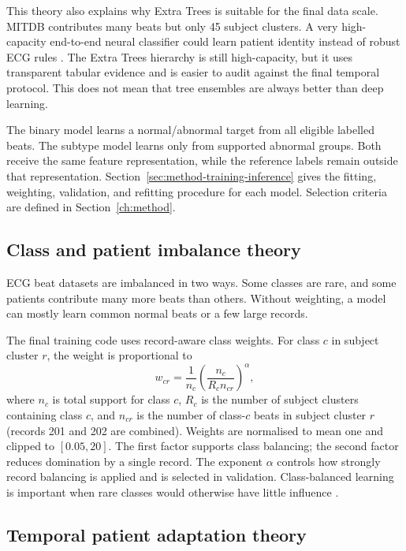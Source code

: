 This theory also explains why Extra Trees is suitable for the final data scale.
MITDB contributes many beats but only 45 subject clusters. A very high-capacity
end-to-end neural classifier could learn patient identity instead of robust ECG
rules \cite{zhang2021interpatient}. The Extra Trees hierarchy is still
high-capacity, but it uses transparent tabular evidence and is easier to audit
against the final temporal protocol. This does not mean that tree ensembles are
always better than deep learning.

The binary model learns a normal/abnormal target from all eligible labelled
beats. The subtype model learns only from supported abnormal groups. Both
receive the same feature representation, while the reference labels remain
outside that representation. Section~\ref{sec:method-training-inference}
gives the fitting, weighting, validation, and refitting procedure for each
model. Selection criteria are defined in Section~\ref{ch:method}.

\subsection{Class and patient imbalance theory}

ECG beat datasets are imbalanced in two ways. Some classes are rare, and some
patients contribute many more beats than others. Without weighting, a model can
mostly learn common normal beats or a few large records.

The final training code uses record-aware class weights. For class $c$ in
subject cluster $r$, the weight is proportional to
\begin{equation}
 w_{cr}=\frac{1}{n_c}
 \left(\frac{n_c}{R_c n_{cr}}\right)^\alpha,
 \label{eq:record-weight}
\end{equation}
where $n_c$ is total support for class $c$, $R_c$ is the number of subject clusters
containing class $c$, and $n_{cr}$ is the number of class-$c$ beats in subject cluster
$r$ (records 201 and 202 are combined). Weights are normalised to mean one
and clipped to $[0.05,20]$. The first factor supports class balancing; the second factor reduces
domination by a single record. The exponent $\alpha$ controls how strongly
record balancing is applied and is selected in validation. Class-balanced
learning is important when rare classes would otherwise have little influence
\cite{cui2019classbalanced}.

\subsection{Temporal patient adaptation theory}

